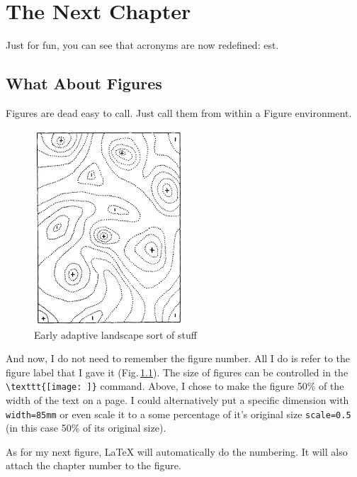 \chapter{The Next Chapter} 
\label{nextChapt} 

Just for fun, you can see that acronyms are now redefined: \ac{est}.

\section{What About Figures}

Figures are dead easy to call. Just call them from within a Figure environment.

\begin{figure}[ht] %
	\centering
	\includegraphics[width=0.5\textwidth]{Figs/Wright_1932_1.pdf}
    \caption[Adaptive landscape]{Early adaptive landscape sort of stuff}
    \label{landscape}
\end{figure}

And now, I do not need to remember the figure number. All I do is refer to the figure label that I gave it (Fig.\,\ref{landscape}). The size of figures can be controlled in the \verb+\texttt{[image: ]}+ command. Above, I chose to make the figure 50\% of the width of the text on a page. I could alternatively put a specific dimension with \verb+width=85mm+ or even scale it to a some percentage of it's original size \verb+scale=0.5+ (in this case 50\% of its original size).  

As for my next figure, \LaTeX{} will automatically do the numbering. It will also attach the chapter number to the figure.



